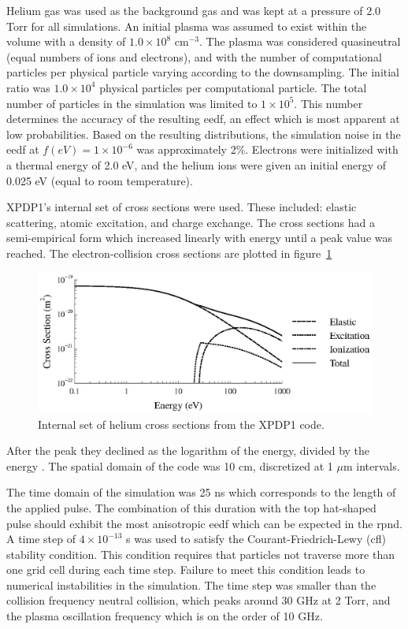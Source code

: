 Helium gas was used as the background gas and was kept at a pressure of 2.0 Torr
for all simulations. An initial plasma was assumed to exist within the volume
with a density of $1.0\times10^{8}$ cm$^{-3}$. The plasma was considered
quasineutral (equal numbers of ions and electrons), and with the number of
computational particles per physical particle varying according to the
downsampling. The initial ratio was $1.0\times10^4$ physical particles per
computational particle. The total number of particles in the simulation was
limited to $1\times10^5$. This number determines the accuracy of the resulting
\acs{eedf}, an effect which is most apparent at low probabilities. Based on the
resulting distributions, the simulation noise in the \acs{eedf} at
$f(eV)=1\times10^{-6}$ was approximately 2\%. Electrons were initialized with a
thermal energy of 2.0 eV, and the helium ions were given an initial energy of
0.025 eV (equal to room temperature).

XPDP1's internal set of cross sections were used. These included:
elastic scattering, atomic excitation, and charge exchange. The cross
sections had a semi-empirical form which increased linearly with energy
until a peak value was reached. The electron-collision cross sections
are plotted in figure~\ref{fig:xsecs}
\begin{figure}
  \centering
  \includegraphics{./chapters/modeling/figures/xsecs.eps}
  \caption{Internal set of helium cross sections from the XPDP1 code.}
  \label{fig:xsecs}
\end{figure}
After the peak they declined as the logarithm of the energy, divided by
the energy \cite{Verboncoeur1993}. The spatial domain of the code was 10
cm, discretized at 1 $\mu$m intervals.

The time domain of the simulation was 25 ns which corresponds to the length of
the applied pulse. The combination of this duration with the top hat-shaped
pulse should exhibit the most anisotropic \acs{eedf} which can be expected in
the \acs{rpnd}. A time step of $4\times10^{-13}$ s was used to satisfy the
Courant-Friedrich-Lewy (\acs{cfl}) stability condition. This condition requires
that particles not traverse more than one grid cell during each time step.
Failure to meet this condition leads to numerical instabilities in the
simulation. The time step was smaller than the collision frequency neutral
collision, which peaks around 30 GHz at 2 Torr, and the plasma oscillation
frequency which is on the order of 10 GHz.

